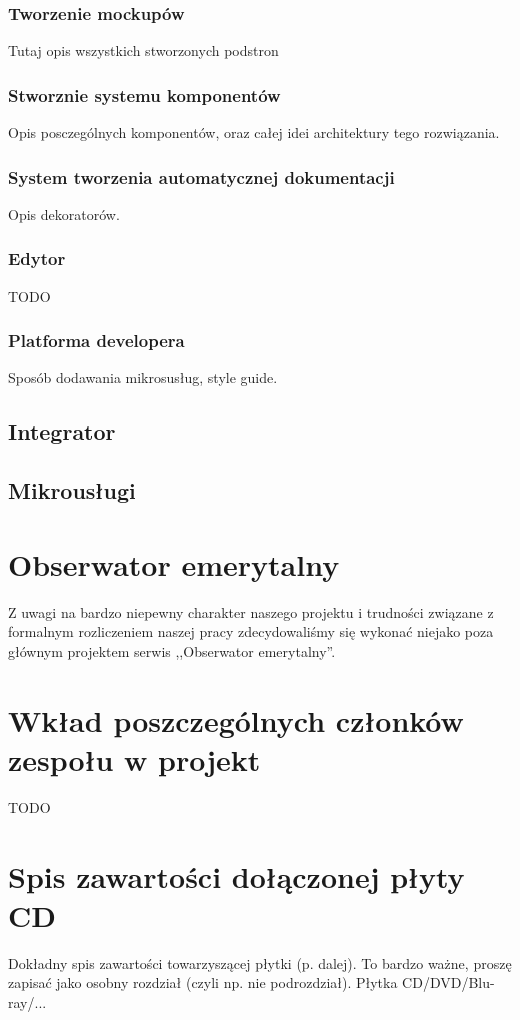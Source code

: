 \documentclass[licencjacka]{pracamgr}
\begin{document}
\subsection{Tworzenie mockupów}
Tutaj opis wszystkich stworzonych podstron
\subsection{Stworznie systemu komponentów}
Opis posczególnych komponentów, oraz całej idei architektury tego rozwiązania.
\subsection{System tworzenia automatycznej dokumentacji}
Opis dekoratorów.
\subsection{Edytor}
TODO
\subsection{Platforma developera}
Sposób dodawania mikrosusług, style guide.

\section{Integrator}

\section{Mikrousługi}

\chapter{Obserwator emerytalny}
Z uwagi na bardzo niepewny charakter naszego projektu i trudności związane z
formalnym rozliczeniem naszej pracy zdecydowaliśmy się wykonać niejako poza
głównym projektem serwis ,,Obserwator emerytalny''.

\chapter{Wkład poszczególnych członków zespołu w projekt}\label{r:wklad}
TODO
\appendix
\chapter{Spis zawartości dołączonej płyty CD}\label{r:spis}
Dokładny spis zawartości towarzyszącej płytki (p. dalej). To bardzo ważne, proszę zapisać jako osobny rozdział (czyli np. nie podrozdział). Płytka CD/DVD/Blu-ray/...
\end{document}
